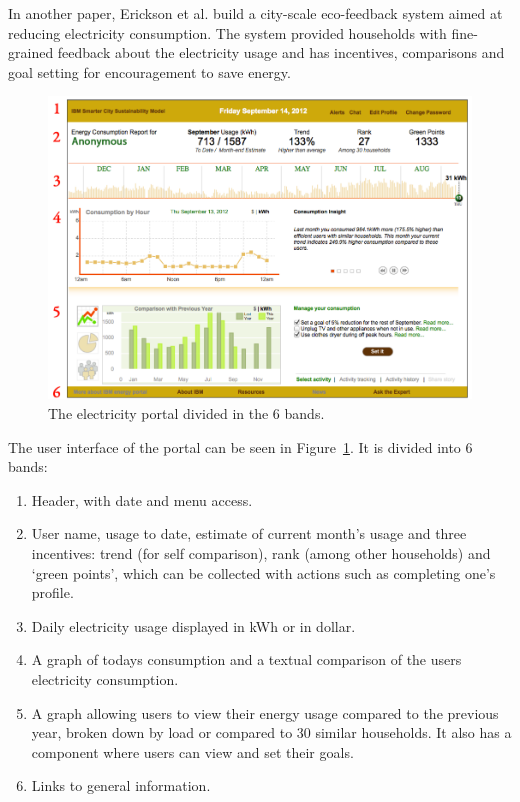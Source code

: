 \documentclass[journal]{vgtc}                %
\begin{document}
In another paper, Erickson et al.\cite{erickson2013dubuque} build a city-scale eco-feedback system aimed at reducing electricity consumption. The system provided households with fine-grained feedback about the electricity usage and has incentives, comparisons and goal setting for encouragement to save energy. \\

\begin{figure}[h]
	\centering
	\includegraphics[scale=0.26]{./electricity_portal.png}
	\caption{The electricity portal divided in the 6 bands.}
	\label{fig:electricityportal}
\end{figure}

The user interface of the portal can be seen in Figure~\ref{fig:electricityportal}. It is divided into 6 bands:
\begin{enumerate}
\item Header, with date and menu access.
\item User name, usage to date, estimate of current month's usage and three incentives: trend (for self comparison), rank (among other households) and `green points', which can be collected with actions such as completing one's profile.
\item Daily electricity usage displayed in kWh or in dollar.
\item A graph of todays consumption and a textual comparison of the users electricity consumption.
\item A graph allowing users to view their energy usage compared to the previous year, broken down by load or compared to 30 similar households. It also has a component where users can view and set their goals.
\item Links to general information.
\end{enumerate}
\end{document}
